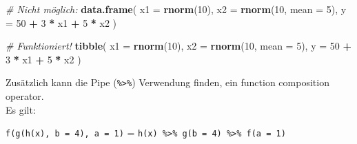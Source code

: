 \documentclass[ngerman,a4paper,]{scrartcl}
\newenvironment{Shaded}{\begin{snugshade}}{\end{snugshade}}
\newcommand{\CommentTok}[1]{\textcolor[rgb]{0.56,0.35,0.01}{\textit{#1}}}
\newcommand{\DataTypeTok}[1]{\textcolor[rgb]{0.13,0.29,0.53}{#1}}
\newcommand{\DecValTok}[1]{\textcolor[rgb]{0.00,0.00,0.81}{#1}}
\newcommand{\KeywordTok}[1]{\textcolor[rgb]{0.13,0.29,0.53}{\textbf{#1}}}
\newcommand{\NormalTok}[1]{#1}
\newcommand{\OperatorTok}[1]{\textcolor[rgb]{0.81,0.36,0.00}{\textbf{#1}}}
\newcommand{\StringTok}[1]{\textcolor[rgb]{0.31,0.60,0.02}{#1}}
\theoremstyle{definition}
\theoremstyle{definition}
\theoremstyle{definition}
\theoremstyle{remark}
\begin{document}
\begin{Shaded}
\begin{Highlighting}[]
\CommentTok{# Nicht möglich:}
\KeywordTok{data.frame}\NormalTok{(}
   \DataTypeTok{x1 =} \KeywordTok{rnorm}\NormalTok{(}\DecValTok{10}\NormalTok{),}
   \DataTypeTok{x2 =} \KeywordTok{rnorm}\NormalTok{(}\DecValTok{10}\NormalTok{, }\DataTypeTok{mean =} \DecValTok{5}\NormalTok{),}
   \DataTypeTok{y =} \DecValTok{50} \OperatorTok{+}\StringTok{ }\DecValTok{3} \OperatorTok{*}\StringTok{ }\NormalTok{x1 }\OperatorTok{+}\StringTok{ }\DecValTok{5} \OperatorTok{*}\StringTok{ }\NormalTok{x2}
\NormalTok{)}

\CommentTok{# Funktioniert!}
\KeywordTok{tibble}\NormalTok{(}
   \DataTypeTok{x1 =} \KeywordTok{rnorm}\NormalTok{(}\DecValTok{10}\NormalTok{),}
   \DataTypeTok{x2 =} \KeywordTok{rnorm}\NormalTok{(}\DecValTok{10}\NormalTok{, }\DataTypeTok{mean =} \DecValTok{5}\NormalTok{),}
   \DataTypeTok{y =} \DecValTok{50} \OperatorTok{+}\StringTok{ }\DecValTok{3} \OperatorTok{*}\StringTok{ }\NormalTok{x1 }\OperatorTok{+}\StringTok{ }\DecValTok{5} \OperatorTok{*}\StringTok{ }\NormalTok{x2}
\NormalTok{)}
\end{Highlighting}
\end{Shaded}

Zusätzlich kann die Pipe (\texttt{\%\textgreater{}\%}) Verwendung finden, ein function composition operator.\\
Es gilt:

\texttt{f(g(h(x),\ b\ =\ 4),\ a\ =\ 1)} = \texttt{h(x)\ \%\textgreater{}\%\ g(b\ =\ 4)\ \%\textgreater{}\%\ f(a\ =\ 1)}
\end{document}
